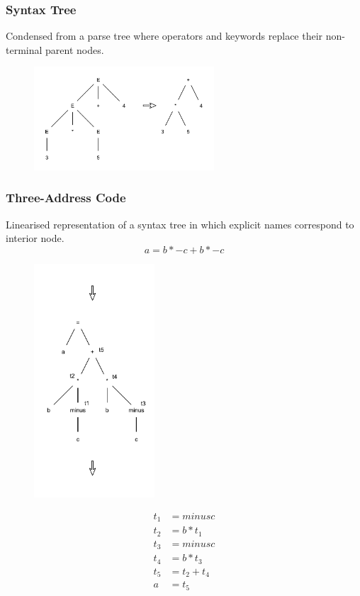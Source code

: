 \subsubsection{Syntax Tree}
Condensed from a parse tree where operators and keywords replace their non-terminal parent nodes.
\begin{figure}[H]
    \centerline{\includegraphics[width=0.6\textwidth]{img/15.pdf}}
\end{figure}

\subsubsection{Three-Address Code}
Linearised representation of a syntax tree in which explicit names correspond to interior node.
$$
    a = b \ast -c + b \ast -c
$$
\begin{figure}[H]
    \centerline{\includegraphics[width=0.4\textwidth]{img/16.pdf}}
\end{figure}
\begin{align*}
    t_1 &= minus c \\
    t_2 &= b \ast t_1 \\
    t_3 &= minus c \\
    t_4 &= b \ast t_3 \\
    t_5 &= t_2 + t_4 \\
    a &= t_5
\end{align*}

